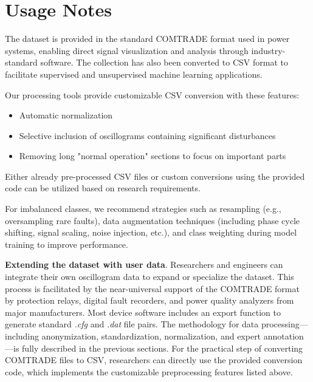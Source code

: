 \documentclass{article}
\begin{document}
\section*{Usage Notes}

The dataset is provided in the standard COMTRADE format used in power systems, enabling direct signal visualization and analysis through industry-standard software. The collection has also been converted to CSV format to facilitate supervised and unsupervised machine learning applications.



Our processing tools provide customizable CSV conversion with these features:
\begin{itemize}

    \item Automatic normalization

    \item Selective inclusion of oscillograms containing significant disturbances

    \item Removing long "normal operation" sections to focus on important parts

\end{itemize}

Either already pre-processed CSV files or custom conversions using the provided code can be utilized based on research requirements.

For imbalanced classes, we recommend strategies such as resampling (e.g., oversampling rare faults), data augmentation techniques (including phase cycle shifting, signal scaling, noise injection, etc.), and class weighting during model training to improve performance.

\textbf{Extending the dataset with user data}. Researchers and engineers can integrate their own oscillogram data to expand or specialize the dataset. This process is facilitated by the near-universal support of the COMTRADE format by protection relays, digital fault recorders, and power quality analyzers from major manufacturers. Most device software includes an export function to generate standard \emph{.cfg} and \emph{.dat} file pairs. The methodology for data processing—including anonymization, standardization, normalization, and expert annotation—is fully described in the previous sections. For the practical step of converting COMTRADE files to CSV, researchers can directly use the provided conversion code, which implements the customizable preprocessing features listed above.
\end{document}

